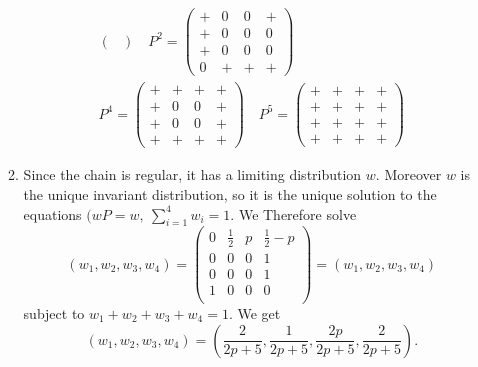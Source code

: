 \documentclass[11pt,a4paper]{article}
\begin{document}
\begin{enumerate}
\begin{enumerate}
\begin{align*}
\begin{pmatrix}
                \end{pmatrix}
                \quad
                P^2
                =
                \begin{pmatrix}
                    + & 0 & 0 & + \\
                    + & 0 & 0 & 0 \\
                    + & 0 & 0 & 0 \\
                    0 & + & + & + 
                \end{pmatrix}\\
                P^4
                =
                \begin{pmatrix}
                    + & + & + & + \\
                    + & 0 & 0 & + \\
                    + & 0 & 0 & + \\
                    + & + & + & + 
                \end{pmatrix}
                \quad
                P^5
                =
                \begin{pmatrix}
                    + & + & + & + \\
                    + & + & + & + \\
                    + & + & + & + \\
                    + & + & + & + 
                \end{pmatrix}
            \end{align*}
            \item  Since the chain is regular, it has a limiting distribution $w$. Moreover $w$ is the unique invariant distribution, so it is the unique solution to the equations $(wP = w,\ \sum_{i=1}^4w_i=1$. We Therefore solve
            $$
            (w_1, w_2, w_3, w_4)
            =
            \begin{pmatrix}
                0 & \frac{1}{2} & p & \frac{1}{2} - p\\
                0 & 0 & 0 & 1\\
                0 & 0 & 0 & 1\\
                1 & 0 & 0 & 0\\
            \end{pmatrix}
            =
            (w_1, w_2, w_3, w_4)
            $$
            subject to $w_1+w_2+w_3+w_4 = 1$. We get
            $$
            (w_1, w_2, w_3, w_4)
            =
            \left(\frac{2}{2p+5}, \frac{1}{2p+5}, \frac{2p}{2p+5}, \frac{2}{2p+5}\right).
$$
\end{enumerate}
\end{enumerate}
\end{document}
